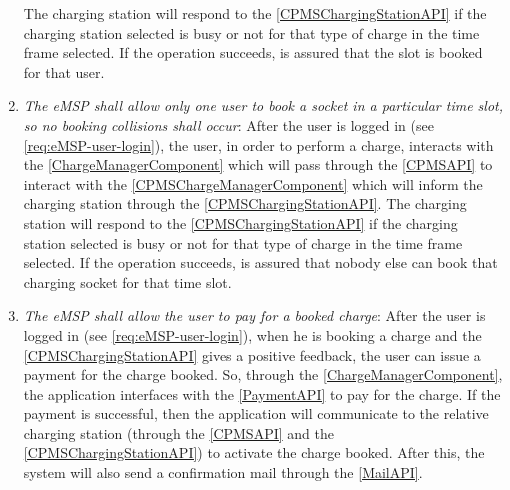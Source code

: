 \begin{enumerate}[label=\textbf{R\arabic*}]
          The charging station will respond to the \ref{CPMSChargingStationAPI} if the charging station selected is busy or not for that type of charge in the time frame selected. If the operation succeeds, is assured that the slot is booked for that user.
          \label{req:eMSP-reserve-socket}
    \item \textit{The \ac{eMSP} shall allow only one user to book a socket in a particular time slot, so no booking collisions shall occur}:
          After the user is logged in (see \ref{req:eMSP-user-login}), the user, in order to perform a charge, interacts with the \ref{ChargeManagerComponent} which will pass through the \ref{CPMSAPI} to interact with the \ref{CPMSChargeManagerComponent} which will inform the charging station through the \ref{CPMSChargingStationAPI}.
          The charging station will respond to the \ref{CPMSChargingStationAPI} if the charging station selected is busy or not for that type of charge in the time frame selected. If the operation succeeds, is assured that nobody else can book that charging socket for that time slot.
          \label{req:eMSP-no-book-collisions}
    \item \textit{The \ac{eMSP} shall allow the user to pay for a booked charge}:
          After the user is logged in (see \ref{req:eMSP-user-login}), when he is booking a charge and the \ref{CPMSChargingStationAPI} gives a positive feedback, the user can issue a payment for the charge booked.
          So, through the \ref{ChargeManagerComponent}, the application interfaces with the \ref{PaymentAPI} to pay for the charge. If the payment is successful, then the application will communicate to the relative charging station (through the \ref{CPMSAPI} and the \ref{CPMSChargingStationAPI}) to activate the charge booked.
          After this, the system will also send a confirmation mail through the \ref{MailAPI}.

\end{enumerate}

